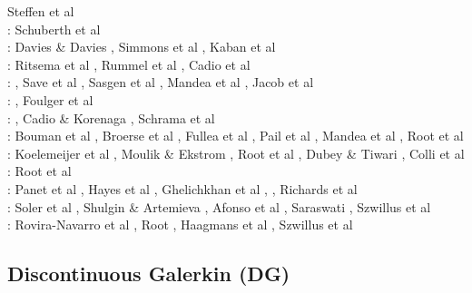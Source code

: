 \begin{scriptsize}
Steffen et al \cite{stdm08}\\
\twothousandnine: Schuberth et al \cite{scbr09}\\
\twothousandten: Davies \& Davies \cite{dada10}, Simmons et al \cite{sifb10}, Kaban et al \cite{katc10}\\
\twothousandeleven: Ritsema et al \cite{ridv11}, Rummel et al \cite{ruys11}, Cadio et al \cite{capd11}\\
\twothousandtwelve: \cite{hawj12}\cite{resa12}\cite{hawj12}\cite{fesw12}\cite{simj12}\cite{beck12}\cite{pahk12}, Save et al \cite{sabt12}, Sasgen et al \cite{sakm12}, Mandea et al \cite{mapl12}, Jacob et al \cite{jawp12}\\
\twothousandthirteen: \cite{ress13}\cite{ebbf13}\cite{davi13}\cite{scle13}\cite{waja13}, Foulger et al \cite{fopa13}\\
\twothousandfourteen: \cite{paml14}\cite{ebbf14}\cite{krbk14}\cite{licl14}\cite{aubb14}, 
Cadio \& Korenaga \cite{cako14}, Schrama et al \cite{scwr14}\\
\twothousandfifteen: Bouman et al \cite{boem15}, Broerse et al \cite{brrs15}, Fullea et al \cite{furc15}, Pail et al \cite{pabb15},
Mandea et al \cite{manp15}, Root et al \cite{rotv15}\\
\twothousandsixteen: Koelemeijer et al \cite{kord16}, Moulik \& Ekstrom \cite{moek16}, Root et al \cite{rond16}, 
Dubey \& Tiwari \cite{duti16}, Colli et al \cite{cogb16}\\
\twothousandseventeen: Root et al \cite{roev17}\\
\twothousandeighteen: Panet et al \cite{pabn18}, Hayes et al \cite{hamp18}, Ghelichkhan et al \cite{ghmc18}, \cite{homs18}, Richards et al \cite{rihc18}\\
\twothousandnineteen: Soler et al \cite{sopg19}, Shulgin \& Artemieva \cite{shar19}, Afonso et al \cite{afss19}, 
Saraswati \cite{sacm19}, Szwillus et al \cite{szae19}\\
\twothousandtwenty: Rovira-Navarro et al \cite{rovb20}, Root \cite{root20}, Haagmans et al \cite{hasm20}, Szwillus et al \cite{szes20}
\end{scriptsize}

\subsection{Discontinuous Galerkin (DG)}


